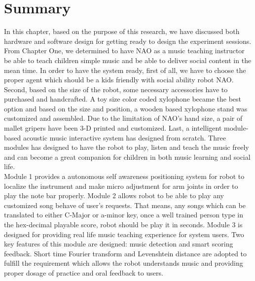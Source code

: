 \section{Summary}
In this chapter, based on the purpose of this research, we have discussed both hardware
and software design for getting ready to design the experiment sessions.\\

From Chapter One, we determined to have NAO as a music teaching instructor be able
to teach children simple music and be able to deliver social content in the mean time.
In order to have the system ready, first of all, we have to choose the proper agent which should be a
kids friendly with social ability robot NAO. Second, based on the size of the robot, some necessary
accessories have to purchased and handcrafted. A toy size color coded xylophone became the
best option and based on the size and position, a wooden based xylophone stand was 
customized and assembled. Due to the limitation of NAO's hand size, a pair of mallet gripers 
have been 3-D printed and customized. Last, a intelligent module-based acoustic music 
interactive system has designed from scratch. Three modules has designed to have the
robot to play, listen and teach the music freely and can become a great companion for children
in both music learning and social life. \\

Module 1 provides a autonomous self awareness positioning system for robot to localize
the instrument and make micro adjustment for arm joints in order to play the note bar properly.
Module 2 allows robot to be able to play any customized song behave of user's requests. That
means, any songs which can be translated to either C-Major or a-minor key, once a well trained
person type in the hex-decimal playable score, robot should be play it in seconds. Module 3
is designed for providing real life music teaching experience for system users. Two key features
of this module are designed: music detection and smart scoring feedback. Short time Fourier transform
and Levenshtein distance are adopted to fulfill the requirement which allows the robot understands
music and providing proper dosage of practice and oral feedback to users.\\


